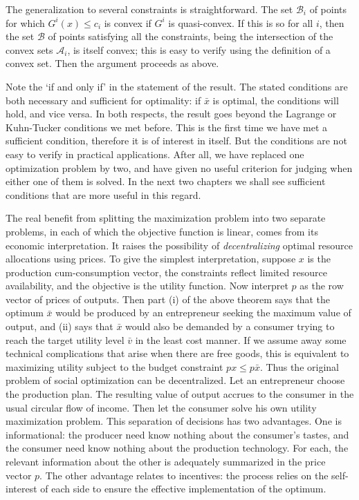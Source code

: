 The generalization to several constraints is straightforward. The set $\mathcal{B}_i$ of points for which $G^i(x) \leq c_i$ is convex if $G^i$ is quasi-convex. If this is so for all $i$, then the set $\mathcal{B}$ of points satisfying all the constraints, being the intersection of the convex sets $\mathcal{A}_i$, is itself convex; this is easy to verify using the definition of a convex set. Then the argument proceeds as above.

Note the `if and only if' in the statement of the result. The stated conditions are both necessary and sufficient for optimality: if $\bar{x}$ is optimal, the conditions will hold, and vice versa. In both respects, the result goes beyond the Lagrange or Kuhn-Tucker conditions we met before. This is the first time we have met a sufficient condition, therefore it is of interest in itself. But the conditions are not easy to verify in practical applications. After all, we have replaced one optimization problem by two, and have given no useful criterion for judging when either one of them is solved. In the next two chapters we shall see sufficient conditions that are more useful in this regard.

The real benefit from splitting the maximization problem into two separate problems, in each of which the objective function is linear, comes from its economic interpretation. It raises the possibility of \textit{decentralizing} optimal resource allocations using prices. To give the simplest interpretation, suppose $x$ is the production cum-consumption vector, the constraints reflect limited resource availability, and the objective is the utility function. Now interpret $p$ as the row vector of prices of outputs. Then part (i) of the above theorem says that the optimum $\bar{x}$ would be produced by an entrepreneur seeking the maximum value of output, and (ii) says that $\bar{x}$ would also be demanded by a consumer trying to reach the target utility level $\bar{v}$ in the least cost manner. If we assume away some technical complications that arise when there are free goods, this is equivalent to maximizing utility subject to the budget constraint $px \leq p \bar{x}$. Thus the original problem of social optimization can be decentralized. Let an entrepreneur choose the production plan. The resulting value of output accrues to the consumer in the usual circular flow of income. Then let the consumer solve his own utility maximization problem. This separation of decisions has two advantages. One is informational: the producer need know nothing about the consumer's tastes, and the consumer need know nothing about the production technology. For each, the relevant information about the other is adequately summarized in the price vector $p$. The other advantage relates to incentives: the process relies on the self-interest of each side to ensure the effective implementation of the optimum.

